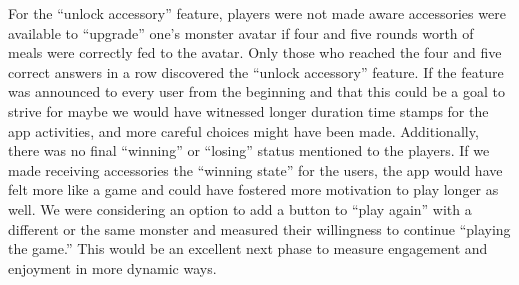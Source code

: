
For the ``unlock accessory'' feature, players were not made aware accessories were available to ``upgrade'' one's monster avatar if four and five rounds worth of meals were correctly fed to the avatar. Only those who reached the four and five correct answers in a row discovered the ``unlock accessory'' feature. If the feature was announced to every user from the beginning and that this could be a goal to strive for maybe we would have witnessed longer duration time stamps for the app activities, and more careful choices might have been made. Additionally, there was no final ``winning'' or ``losing'' status mentioned to the players. If we made receiving accessories the ``winning state'' for the users, the app would have felt more like a game and could have fostered more motivation to play longer as well. We were considering an option to add a button to ``play again'' with a different or the same monster and measured their willingness to continue ``playing the game.'' This would be an excellent next phase to measure engagement and enjoyment in more dynamic ways. 





